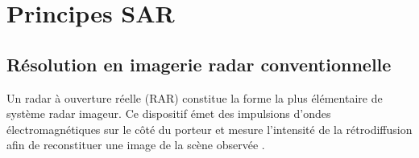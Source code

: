 




\section{Principes SAR}
\label{sec:principes_sar}

\subsection{Résolution en imagerie radar conventionnelle}

Un radar à ouverture réelle (RAR) constitue la forme la plus élémentaire de système radar imageur. Ce dispositif émet des impulsions d'ondes électromagnétiques sur le côté du porteur et mesure l'intensité de la rétrodiffusion afin de reconstituer une image de la scène observée \cite{chan2008sar, curlander1991sar}.

